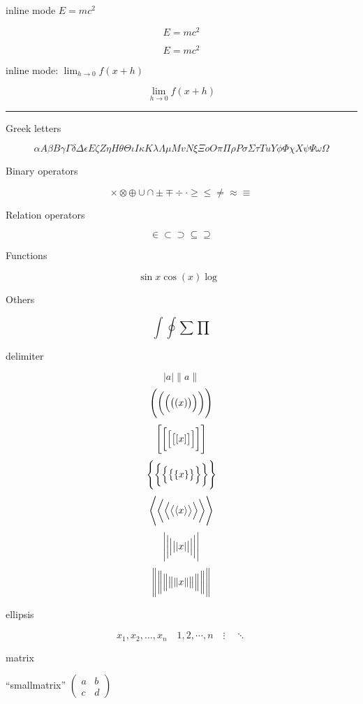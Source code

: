\documentclass{article}
\DeclareMathOperator{\myMr}{M_{\mathbb{R}}}
\begin{document}
\noindent inline mode $E = mc^2$

\[E= mc^2\]

\begin{equation}
    E=mc^2
\end{equation}

\noindent inline mode: \(\lim_{h \rightarrow 0} f\left(x+h \right) \)

\[\lim_{h \rightarrow 0} f\left(x+h \right) \]

\noindent\rule{\linewidth}{0.4pt}

\noindent Greek letters

\[\alpha A \beta B \gamma \Gamma \delta \Delta \epsilon E \zeta Z \eta H \theta \Theta \iota I \kappa K \lambda \Lambda \mu M v N \xi \Xi o O \pi \Pi \rho P  \sigma \Sigma \tau T u Y \phi \Phi \chi X \psi \Psi \omega \Omega \]

\noindent Binary operators

\[\times \otimes \oplus \cup \cap \pm \mp \div \cdot \geq \leq \neq \approx \equiv \]

\noindent Relation operators

\[< > \in \subset \supset \subseteq \supseteq \]

\noindent Functions

\[\sin x \cos \left( x \right) \log \myMr \]

\noindent Others

\[\int \oint \sum \prod \]

\noindent delimiter

\[ \lvert a \rvert \lVert a \rVert \]
\[ \Biggl(\biggl(\Bigl(\bigl((x)\bigr)\Bigr)\biggr)\Biggr) \]
\[ \Biggl[\biggl[\Bigl[\bigl[[x]\bigr]\Bigr]\biggr]\Biggr] \]
\[ \Biggl \{\biggl \{\Bigl \{\bigl \{\{x\}\bigr \}\Bigr \}\biggr \}\Biggr\} \]
\[ \Biggl\langle\biggl\langle\Bigl\langle\bigl\langle\langle x
\rangle\bigr\rangle\Bigr\rangle\biggr\rangle\Biggr\rangle \]
\[ \Biggl\lvert\biggl\lvert\Bigl\lvert\bigl\lvert\lvert x
\rvert\bigr\rvert\Bigr\rvert\biggr\rvert\Biggr\rvert \]
\[ \Biggl\lVert\biggl\lVert\Bigl\lVert\bigl\lVert\lVert x
\rVert\bigr\rVert\Bigr\rVert\biggr\rVert\Biggr\rVert \]

\noindent ellipsis

\[ x_1,x_2,\dots ,x_n\quad 1,2,\cdots ,n\quad \vdots\quad \ddots \]

\noindent matrix

``smallmatrix'' $ ( \begin{smallmatrix} a&b\\c&d \end{smallmatrix} ) $
\end{document}
